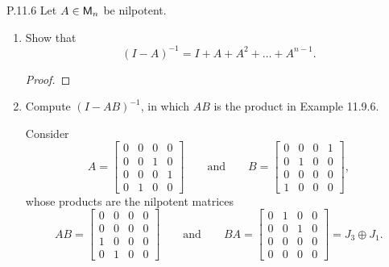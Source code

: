 \documentclass{../homework}
\date{Tuesday 4/16}
\author{}
\begin{document}
\begin{problems}
\item[P.11.6] Let \(A \in \mathsf{M}_n\) be nilpotent.
  \begin{enumerate}
  \item Show that
    \[
      (I-A)^{-1} = I + A + A^2 + \dots + A^{n-1}.
    \]

    \begin{solution}
      \begin{proof}

      \end{proof}
    \end{solution}

  \item Compute \((I-AB)^{-1}\), in which \(AB\) is the product in
    Example 11.9.6.

    \begin{bookexample}
      Consider
      \[
        A =
        \begin{bmatrix}
          0&0&0&0 \\ 0&0&1&0 \\ 0&0&0&1 \\ 0&1&0&0
        \end{bmatrix}
        \qquad\text{and}\qquad
        B =
        \begin{bmatrix}
          0&0&0&1 \\ 0&1&0&0 \\ 0&0&0&0 \\ 1&0&0&0
        \end{bmatrix},
      \]
      whose products are the nilpotent matrices
      \[
        AB =
        \begin{bmatrix}
          0&0&0&0 \\ 0&0&0&0 \\ 1&0&0&0 \\ 0&1&0&0
        \end{bmatrix}
        \qquad\text{and}\qquad
        BA =
        \begin{bmatrix}
          0&1&0&0 \\ 0&0&1&0 \\ 0&0&0&0 \\ 0&0&0&0
        \end{bmatrix}
        = J_3 \oplus J_1.
      \]
    \end{bookexample}

    \begin{solution}

    \end{solution}
  \end{enumerate}


\end{problems}
\end{document}
